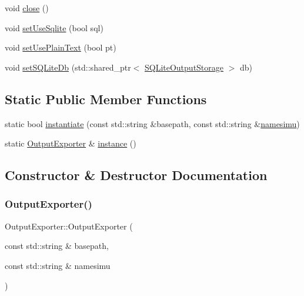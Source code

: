 \begin{DoxyCompactItemize}
\item 
void \mbox{\hyperlink{class_output_exporter_a37f5173ec97f4745bb88212acb3d8ab6}{close}} ()
\item 
void \mbox{\hyperlink{class_output_exporter_a17902545a956dbc8aaddda2e3561fdc3}{set\+Use\+Sqlite}} (bool sql)
\item 
void \mbox{\hyperlink{class_output_exporter_a0a0f6b3c5c3efc372f4e39118e9c1035}{set\+Use\+Plain\+Text}} (bool pt)
\item 
void \mbox{\hyperlink{class_output_exporter_a3346f1bea9096bc59c3404493eeaa6cf}{set\+S\+Q\+Lite\+Db}} (std\+::shared\+\_\+ptr$<$ \mbox{\hyperlink{class_s_q_lite_output_storage}{S\+Q\+Lite\+Output\+Storage}} $>$ db)
\end{DoxyCompactItemize}
\subsection*{Static Public Member Functions}
\begin{DoxyCompactItemize}
\item 
static bool \mbox{\hyperlink{class_output_exporter_af5202654829d310492d4099f25802199}{instantiate}} (const std\+::string \&basepath, const std\+::string \&\mbox{\hyperlink{simulator_2main_8cpp_a44a282d0a5b623c9d3e1d35def57a3fe}{namesimu}})
\item 
static \mbox{\hyperlink{class_output_exporter}{Output\+Exporter}} \& \mbox{\hyperlink{class_output_exporter_a174644830e22ece49c6015ef96c11d8e}{instance}} ()
\end{DoxyCompactItemize}


\subsection{Constructor \& Destructor Documentation}
\mbox{\label{class_output_exporter_a178e92b8ff983ba114d1fb3fe362f542}} 
\subsubsection{\texorpdfstring{OutputExporter()}{OutputExporter()}}
{\footnotesize\ttfamily Output\+Exporter\+::\+Output\+Exporter (\begin{DoxyParamCaption}\item[{const std\+::string \&}]{basepath,  }\item[{const std\+::string \&}]{namesimu }\end{DoxyParamCaption})}



